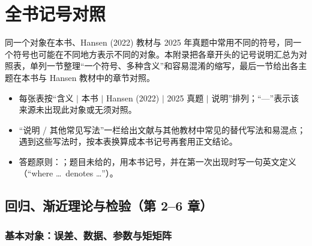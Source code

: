 \chapter{全书记号对照}
\label{ch:UappD-notation}

同一个对象在本书、Hansen (2022) 教材与 2025 年真题中常用不同的符号，同一个符号也可能在不同地方表示不同的对象。本附录把各章开头的记号说明汇总为对照表，单列一节整理“一个符号、多种含义”和容易混淆的缩写，最后一节给出各主题在本书与 Hansen 教材中的章节对照。

\begin{summary}[读表约定与答题原则]
\begin{itemize}
  \item 每张表按“含义 $|$ 本书 $|$ Hansen (2022) $|$ 2025 真题 $|$ 说明”排列；“—”表示该来源未出现此对象或无须对照。
  \item “说明 / 其他常见写法”一栏给出文献与其他教材中常见的替代写法和易混点；遇到这些写法时，按本表换算成本书记号再套用正文结论。
  \item 答题原则：；题目未给的，用本书记号，并在第一次出现时写一句英文定义（“where \ldots\ denotes \ldots”）。
\end{itemize}
\end{summary}

\section{回归、渐近理论与检验（第 2–6 章）}\label{sec:UappD-reg}

\subsection{基本对象：误差、数据、参数与矩矩阵}

